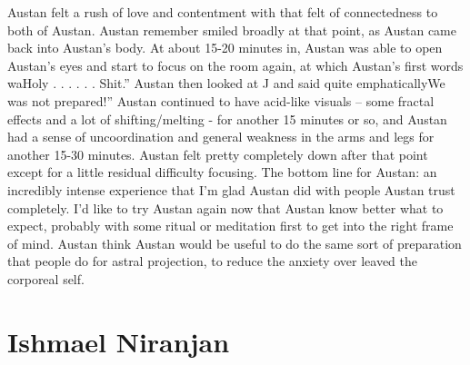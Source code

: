 \documentclass[12pt]{book}
\begin{document}
Austan felt a rush of love and contentment with that felt of connectedness to both of Austan. Austan remember smiled broadly at that point, as Austan came back into Austan's body. At about 15-20 minutes in, Austan was able to open Austan's eyes and start to focus on the room again, at which Austan's first words waHoly . . .   . . .  Shit.'' Austan then looked at J and said quite emphaticallyWe was not prepared!'' Austan continued to have acid-like visuals -- some fractal effects and a lot of shifting/melting - for another 15 minutes or so, and Austan had a sense of uncoordination and general weakness in the arms and legs for another 15-30 minutes. Austan felt pretty completely down after that point except for a little residual difficulty focusing. The bottom line for Austan: an incredibly intense experience that I'm glad Austan did with people Austan trust completely. I'd like to try Austan again now that Austan know better what to expect, probably with some ritual or meditation first to get into the right frame of mind. Austan think Austan would be useful to do the same sort of preparation that people do for astral projection, to reduce the anxiety over leaved the corporeal self.



\chapter{Ishmael Niranjan}
\end{document}
